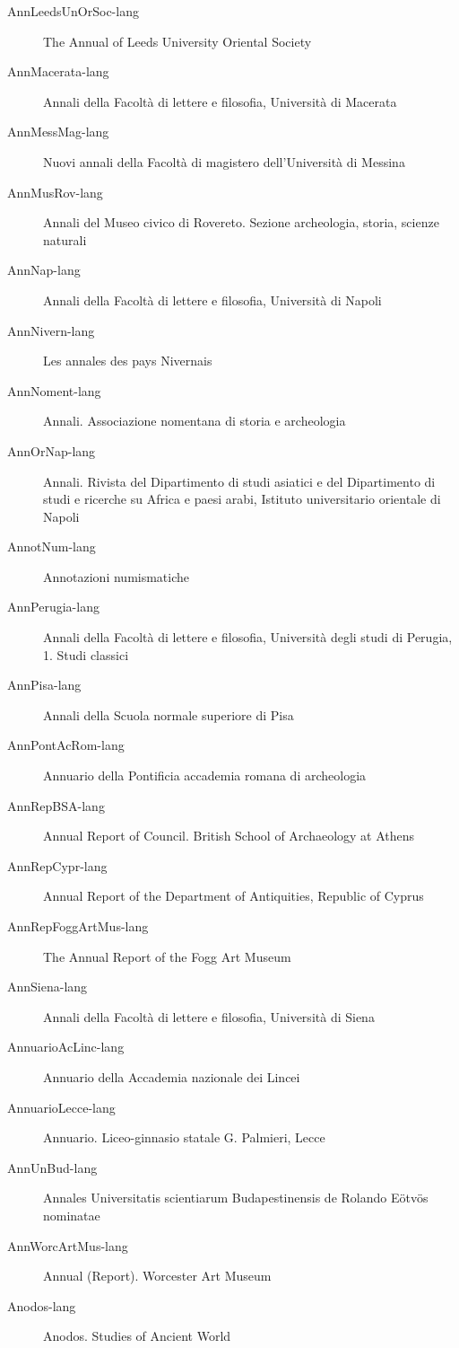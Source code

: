 \begin{footnotesize}
\begin{description}
\item[AnnLeedsUnOrSoc-lang] The Annual of Leeds University Oriental Society 
\item[AnnMacerata-lang] Annali della Facoltà di lettere e filosofia, Università di Macerata 
\item[AnnMessMag-lang] Nuovi annali della Facoltà di magistero dell'Università di Messina 
\item[AnnMusRov-lang] Annali del Museo civico di Rovereto. Sezione archeologia, storia, scienze naturali 
\item[AnnNap-lang] Annali della Facoltà di lettere e filosofia, Università di Napoli 
\item[AnnNivern-lang] Les annales des pays Nivernais 
\item[AnnNoment-lang] Annali. Associazione nomentana di storia e archeologia 
\item[AnnOrNap-lang] Annali. Rivista del Dipartimento di studi asiatici e del Dipartimento di studi e ricerche su Africa e paesi arabi, Istituto universitario orientale di Napoli 
\item[AnnotNum-lang] Annotazioni numismatiche 
\item[AnnPerugia-lang] Annali della Facoltà di lettere e filosofia, Università degli studi di Perugia, 1. Studi classici 
\item[AnnPisa-lang] Annali della Scuola normale superiore di Pisa 
\item[AnnPontAcRom-lang] Annuario della Pontificia accademia romana di archeologia 
\item[AnnRepBSA-lang] Annual Report of Council. British School of Archaeology at Athens 
\item[AnnRepCypr-lang] Annual Report of the Department of Antiquities, Republic of Cyprus 
\item[AnnRepFoggArtMus-lang] The Annual Report of the Fogg Art Museum 
\item[AnnSiena-lang] Annali della Facoltà di lettere e filosofia, Università di Siena 
\item[AnnuarioAcLinc-lang] Annuario della Accademia nazionale dei Lincei 
\item[AnnuarioLecce-lang] Annuario. Liceo-ginnasio statale G. Palmieri, Lecce 
\item[AnnUnBud-lang] Annales Universitatis scientiarum Budapestinensis de Rolando Eötvös nominatae 
\item[AnnWorcArtMus-lang] Annual (Report). Worcester Art Museum 
\item[Anodos-lang] Anodos. Studies of Ancient World 

\end{description}
\end{footnotesize}
